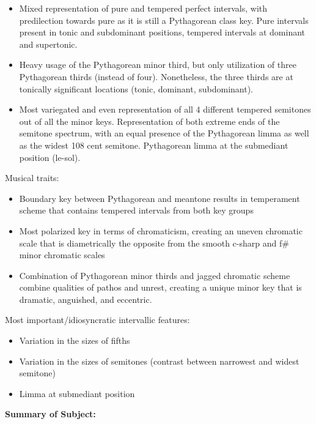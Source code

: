 \begin{itemize}
\tightlist
\item
  Mixed representation of pure and tempered perfect intervals, with
  predilection towards pure as it is still a Pythagorean class key. Pure
  intervals present in tonic and subdominant positions, tempered
  intervals at dominant and supertonic.
\item
  Heavy usage of the Pythagorean minor third, but only utilization of
  three Pythagorean thirds (instead of four). Nonetheless, the three
  thirds are at tonically significant locations (tonic, dominant,
  subdominant).
\item
  Most variegated and even representation of all 4 different tempered
  semitones out of all the minor keys. Representation of both extreme
  ends of the semitone spectrum, with an equal presence of the
  Pythagorean limma as well as the widest 108 cent semitone. Pythagorean
  limma at the submediant position (le-sol).
\end{itemize}

Musical traits:

\begin{itemize}
\tightlist
\item
  Boundary key between Pythagorean and meantone results in temperament
  scheme that contains tempered intervals from both key groups
\item
  Most polarized key in terms of chromaticism, creating an uneven
  chromatic scale that is diametrically the opposite from the smooth
  c-sharp and f\# minor chromatic scales
\item
  Combination of Pythagorean minor thirds and jagged chromatic scheme
  combine qualities of pathos and unrest, creating a unique minor key
  that is dramatic, anguished, and eccentric.
\end{itemize}

Most important/idiosyncratic intervallic features:

\begin{itemize}
\tightlist
\item
  Variation in the sizes of fifths
\item
  Variation in the sizes of semitones (contrast between narrowest and
  widest semitone)
\item
  Limma at submediant position
\end{itemize}

\textbf{Summary of Subject:}



